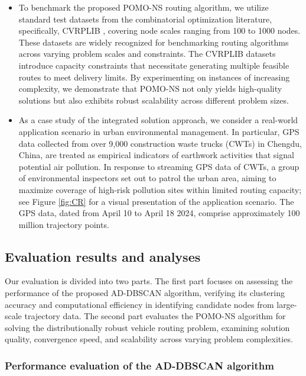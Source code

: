 \documentclass[preprint,12pt,authoryear]{elsarticle}
\theoremstyle{definition}
\begin{document}
\begin{itemize}
\item To benchmark the proposed POMO-NS routing algorithm, we utilize standard test datasets from the combinatorial optimization literature, specifically, CVRPLIB  \citep{uchoa2017new}, covering node scales ranging from 100 to 1000 nodes. These datasets are widely recognized for benchmarking routing algorithms across varying problem scales and constraints. The CVRPLIB datasets introduce capacity constraints that necessitate generating multiple feasible routes to meet delivery limits. 
By experimenting on instances of increasing complexity, we demonstrate that POMO-NS not only yields high-quality solutions but also exhibits robust scalability across different problem sizes. 


\item As a case study of the integrated solution approach, we consider a real-world application scenario in urban environmental management. In particular, GPS data collected from over 9,000 construction waste trucks (CWTs) in Chengdu, China, are treated as empirical indicators of earthwork activities that signal potential air pollution. In response to streaming GPS data of CWTs, a group of environmental inspectors set out to patrol the urban area, aiming to maximize coverage of high-risk pollution sites within limited routing capacity; see Figure \ref{fig:CR} for a visual presentation of the application scenario. The GPS data, dated from April 10 to April 18 2024, comprise approximately 100 million trajectory points. 
\end{itemize}

\subsection{Evaluation results and analyses}

Our evaluation is divided into two parts. The first part focuses on assessing the performance of the proposed AD-DBSCAN algorithm, verifying its clustering accuracy and computational efficiency in identifying candidate nodes from large-scale trajectory data. The second part evaluates the POMO-NS algorithm for solving the distributionally robust vehicle routing problem, examining solution quality, convergence speed, and scalability across varying problem complexities.

\subsubsection{Performance evaluation of the AD-DBSCAN algorithm}
\end{document}

